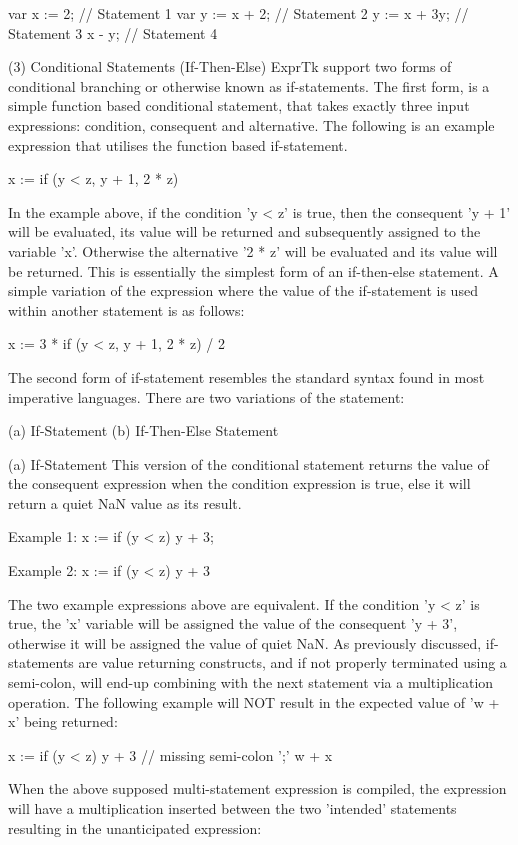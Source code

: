 var x := 2;      // Statement 1
var y := x + 2;  // Statement 2
y := x + 3y;     // Statement 3
x - y;           // Statement 4


(3) Conditional Statements (If-Then-Else)
ExprTk support two forms  of conditional branching or  otherwise known
as  if-statements.  The  first  form,  is  a  simple  function   based
conditional  statement, that  takes exactly  three input  expressions:
condition, consequent  and alternative.  The following  is an  example
expression that utilises the function based if-statement.

x := if (y < z, y + 1, 2 * z)


In the  example above,  if the  condition 'y  < z'  is true,  then the
consequent 'y + 1' will be evaluated, its value will be  returned  and
subsequently assigned to the  variable 'x'. Otherwise the  alternative
'2 *  z' will  be evaluated  and its  value will  be returned. This is
essentially the  simplest form of  an if-then-else statement. A simple
variation of  the expression  where the  value of  the if-statement is
used within another statement is as follows:

x := 3 * if (y < z, y + 1, 2 * z) / 2


The second form of if-statement resembles the standard syntax found in
most imperative languages. There are two variations of the statement:

(a) If-Statement
(b) If-Then-Else Statement


(a) If-Statement
This version  of the  conditional statement  returns the  value of the
consequent expression when the  condition expression is true,  else it
will return a quiet NaN value as its result.

Example 1:
x := if (y < z) y + 3;

Example 2:
x := if (y < z)
{
y + 3
}

The two  example expressions  above are  equivalent. If  the condition
'y < z' is true, the  'x' variable will be  assigned the value of  the
consequent 'y + 3', otherwise it  will be assigned the value of  quiet
NaN.  As  previously  discussed,  if-statements  are  value  returning
constructs, and if  not properly terminated  using a semi-colon,  will
end-up  combining  with  the  next  statement  via  a   multiplication
operation. The following example will NOT result in the expected value
of 'w + x' being returned:

x := if (y < z) y + 3  // missing semi-colon ';'
w + x


When the  above supposed  multi-statement expression  is compiled, the
expression  will  have  a  multiplication  inserted  between  the  two
'intended' statements resulting in the unanticipated expression:

